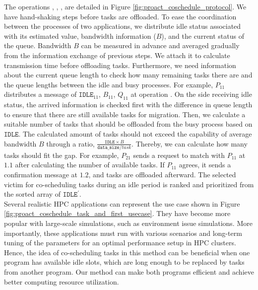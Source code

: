 The operations , , ,  are detailed in Figure \ref{fig:proact_coschedule_protocol}. We have hand-shaking steps before tasks are offloaded. To ease the coordination between the processes of two applications, we distribute idle status associated with its estimated value, bandwidth information ($B$), and the current status of the queue. Bandwidth $B$ can be measured in advance and averaged gradually from the information exchange of previous steps. We attach it to calculate transmission time before offloading tasks. Furthermore, we need information about the current queue length to check how many remaining tasks there are and the queue lengths between the idle and busy processes. For example, $P_{11}$ distributes a message of $\texttt{IDLE}_{11}$, $B_{11}$, $Q_{11}$ at operation . On the side receiving idle status, the arrived information is checked first with the difference in queue length to ensure that there are still available tasks for migration. Then, we calculate a suitable number of tasks that should be offloaded from the busy process based on $\texttt{IDLE}$. The calculated amount of tasks should not exceed the capability of average bandwidth $B$ through a ratio, $\frac{\texttt{IDLE}\times B}{\texttt{data\_size}/task}$. Thereby, we can calculate how many tasks should fit the gap. For example, $P_{21}$ sends a request to match with $P_{11}$ at $1.1$ after calculating the number of available tasks. If $P_{11}$ agrees, it sends a confirmation message at $1.2$, and tasks are offloaded afterward. The selected victim for co-scheduling tasks during an idle period is ranked and prioritized from the sorted array of $\texttt{IDLE}^{'}$.\\

Several realistic HPC applications can represent the use case shown in Figure \ref{fig:proact_coschedule_task_and_first_usecase}. They have become more popular with large-scale simulations, such as environment issue simulations. More importantly, these applications must run with various scenarios and long-term tuning of the parameters for an optimal performance setup in HPC clusters. Hence, the idea of co-scheduling tasks in this method can be beneficial when one program has available idle slots, which are long enough to be replaced by tasks from another program. Our method can make both programs efficient and achieve better computing resource utilization. \\

